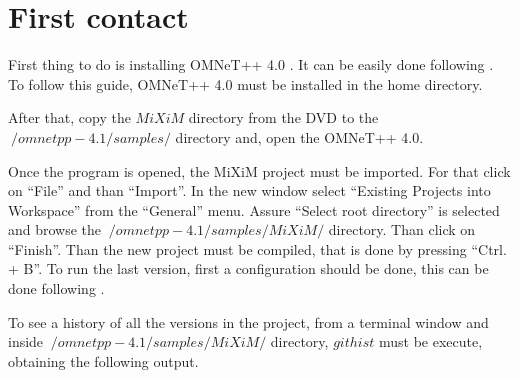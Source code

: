 \section{First contact}

First thing to do is installing \ac{OMNeT++} 4.0 \cite{OMNeT}. It can be easily done following \cite{installationomnet}. To follow this guide, 
\ac{OMNeT++} 4.0 must be installed in the home directory.

After that, copy the $MiXiM$ directory from the \ac{DVD} to the $~/omnetpp-4.1/samples/$ directory and, open the \ac{OMNeT++} 4.0.

Once the program is opened, the MiXiM project must be imported. For that click on ``File'' and than ``Import''. In the new window select 
``Existing Projects into Workspace'' from the ``General'' menu. Assure ``Select root directory'' is selected and browse the 
$~/omnetpp-4.1/samples/MiXiM/$ directory. Than click on ``Finish''. Than the new project must be compiled, that is done by pressing ``Ctrl. + B''.
To run the last version, first a configuration should be done, this can be done following \cite{manualomnet}.

To see a history of all the versions in the project, from a terminal window and inside $~/omnetpp-4.1/samples/MiXiM/$ directory, $git hist$
must be execute, obtaining the following output.

